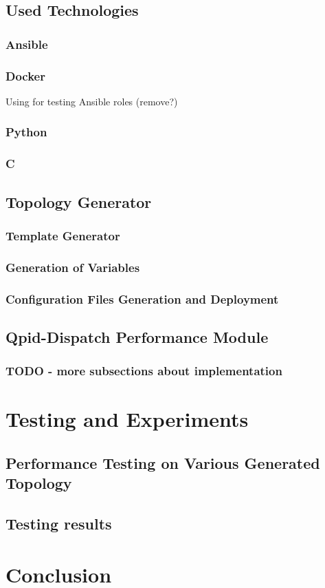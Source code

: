 \section{Used Technologies}

\subsection{Ansible}

\subsection{Docker}
Using for testing Ansible roles (remove?)

\subsection{Python}

\subsection{C}

\section{Topology Generator}

\subsection{Template Generator}

\subsection{Generation of Variables}

\subsection{Configuration Files Generation and Deployment}

\section{Qpid-Dispatch Performance Module}

\subsection{TODO - more subsections about implementation}

\chapter{Testing and Experiments}

\section{Performance Testing on Various Generated Topology}

\section{Testing results}

\chapter{Conclusion}

